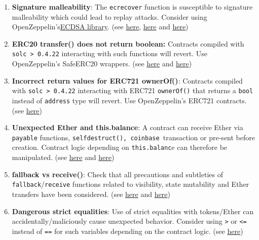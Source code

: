 \begin{enumerate}
\item\textbf{Signature malleability}: The \verb|ecrecover| function is susceptible to signature malleability which could lead to replay attacks. Consider using OpenZeppelin’s\href{https://github.com/OpenZeppelin/openzeppelin-contracts/blob/master/contracts/cryptography/ECDSA.so}{ECDSA library}. (see \href{https://swcregistry.io/docs/SWC-117}{here}, \href{https://swcregistry.io/docs/SWC-121}{here} and \href{https://medium.com/cryptronics/signature-replay-vulnerabilities-in-smart-contracts-3b6f7596df57}{here})

\item\textbf{ERC20 transfer() does not return boolean: }Contracts compiled with \verb|solc > 0.4.22| interacting with such functions will revert. Use OpenZeppelin’s SafeERC20 wrappers. (see \href{https://github.com/crytic/slither/wiki/Detector-Documentation\#incorrect-erc20-interface}{here} and \href{https://medium.com/coinmonks/missing-return-value-bug-at-least-130-tokens-affected-d67bf08521ca}{here})

\item\textbf{Incorrect return values for ERC721 ownerOf()}: Contracts compiled with \verb|solc > 0.4.22| interacting with ERC721 \verb|ownerOf()| that returns a \verb|bool| instead of \verb|address| type will revert. Use OpenZeppelin’s ERC721 contracts. (see \href{https://github.com/crytic/slither/wiki/Detector-Documentation\#incorrect-erc721-interface}{here})

\item\textbf{Unexpected Ether and this.balance}: A contract can receive Ether via \verb|payable| functions, \verb|selfdestruct(), coinbase |transaction or pre-sent before creation. Contract logic depending on \verb|this.balanc|e can therefore be manipulated. (see \href{https://github.com/sigp/solidity-security-blog\#3-unexpected-ether-1}{here} and \href{https://swcregistry.io/docs/SWC-132}{here})

\item \textbf{fallback vs receive()}: Check that all precautions and subtleties of \verb|fallback|/\verb|receive| functions related to visibility, state mutability and Ether transfers have been considered. (see \href{https://docs.soliditylang.org/en/latest/contracts.html\#fallback-function}{here} and \href{https://docs.soliditylang.org/en/latest/contracts.html\#receive-ether-function}{here})

\item\textbf{Dangerous strict equalities}: Use of strict equalities with tokens/Ether can accidentally/maliciously cause unexpected behavior. Consider using \verb|>| or \verb|<=| instead of \verb|==| for such variables depending on the contract logic. (see \href{https://github.com/crytic/slither/wiki/Detector-Documentation\#dangerous-strict-equalities}{here})


\end{enumerate}
